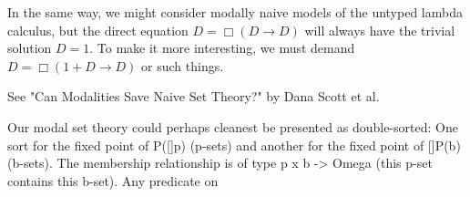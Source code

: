 \begin{TODOblock}
In the same way, we might consider modally naive models of the untyped lambda calculus, but the direct equation $D = \Box(D \to D)$ will always have the trivial solution $D = 1$. To make it more interesting, we must demand $D = \Box(1 + D \to D)$ or such things.

See "Can Modalities Save Naive Set Theory?" by Dana Scott et al.

Our modal set theory could perhaps cleanest be presented as double-sorted: One sort for the fixed point of P([]p) (p-sets) and another for the fixed point of []P(b) (b-sets). The membership relationship is of type p x b -> Omega (this p-set contains this b-set). Any predicate on 
\end{TODOblock}

\fileend